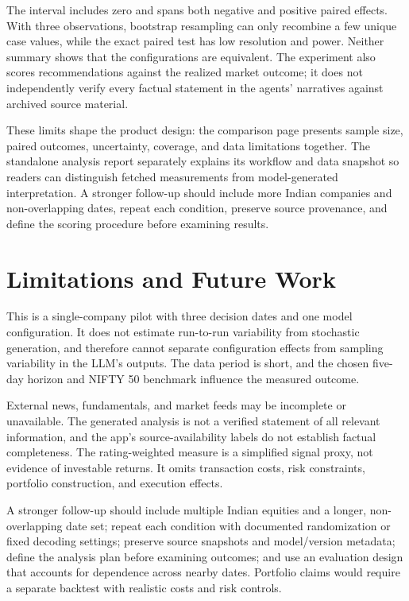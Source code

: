 \documentclass[10pt]{article}
\begin{document}
The interval includes zero and spans both negative and positive paired effects. With three observations, bootstrap resampling can only recombine a few unique case values, while the exact paired test has low resolution and power. Neither summary shows that the configurations are equivalent. The experiment also scores recommendations against the realized market outcome; it does not independently verify every factual statement in the agents' narratives against archived source material.

These limits shape the product design: the comparison page presents sample size, paired outcomes, uncertainty, coverage, and data limitations together. The standalone analysis report separately explains its workflow and data snapshot so readers can distinguish fetched measurements from model-generated interpretation. A stronger follow-up should include more Indian companies and non-overlapping dates, repeat each condition, preserve source provenance, and define the scoring procedure before examining results.

\section{Limitations and Future Work}
This is a single-company pilot with three decision dates and one model configuration. It does not estimate run-to-run variability from stochastic generation, and therefore cannot separate configuration effects from sampling variability in the LLM's outputs. The data period is short, and the chosen five-day horizon and NIFTY 50 benchmark influence the measured outcome.

External news, fundamentals, and market feeds may be incomplete or unavailable. The generated analysis is not a verified statement of all relevant information, and the app's source-availability labels do not establish factual completeness. The rating-weighted measure is a simplified signal proxy, not evidence of investable returns. It omits transaction costs, risk constraints, portfolio construction, and execution effects.

A stronger follow-up should include multiple Indian equities and a longer, non-overlapping date set; repeat each condition with documented randomization or fixed decoding settings; preserve source snapshots and model/version metadata; define the analysis plan before examining outcomes; and use an evaluation design that accounts for dependence across nearby dates. Portfolio claims would require a separate backtest with realistic costs and risk controls.
\end{document}
